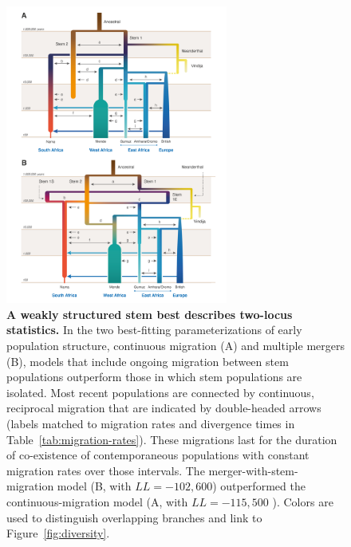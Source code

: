 \documentclass[]{article}
\begin{document}
\begin{figure}[t!]
    \centering
    \includegraphics[width=0.65\textwidth]{figures/best-fit-models}
    \caption{
        \textbf{A weakly structured stem best describes two-locus statistics.}
        In the two best-fitting parameterizations of early population structure,
        continuous migration (A) and multiple mergers (B), models
        that include ongoing migration between stem populations outperform
        those in which stem populations are isolated. Most recent populations are
        connected by continuous, reciprocal migration that are indicated by 
        double-headed arrows (labels matched to migration rates and divergence
        times in Table~\ref{tab:migration-rates}). These migrations last for the
        duration of co-existence of contemporaneous populations with constant
        migration rates over those intervals. The
        merger-with-stem-migration model (B, with  $LL=-102,600$) outperformed the
        continuous-migration model (A, with $LL=-115,500$ ).
        Colors are used to distinguish overlapping branches and link to
        Figure~\ref{fig:diversity}.}
    \label{fig:best-fit-models}
\end{figure}
\end{document}
